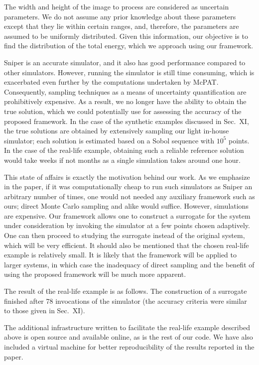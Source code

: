 \begin{authors}
The width and height of the image to process are considered as uncertain
parameters. We do not assume any prior knowledge about these parameters except
that they lie within certain ranges, and, therefore, the parameters are assumed
to be uniformly distributed. Given this information, our objective is to find
the distribution of the total energy, which we approach using our framework.

Sniper is an accurate simulator, and it also has good performance compared to
other simulators. However, running the simulator is still time consuming, which
is exacerbated even further by the computations undertaken by McPAT.
Consequently, sampling techniques as a means of uncertainty quantification are
prohibitively expensive. As a result, we no longer have the ability to obtain
the true solution, which we could potentially use for assessing the accuracy of
the proposed framework. In the case of the synthetic examples discussed in
Sec.~XI, the true solutions are obtained by extensively sampling our light
in-house simulator; each solution is estimated based on a Sobol sequence with
$10^5$ points. In the case of the real-life example, obtaining such a reliable
reference solution would take weeks if not months as a single simulation takes
around one hour.

This state of affairs is exactly the motivation behind our work. As we emphasize
in the paper, if it was computationally cheap to run such simulators as Sniper
an arbitrary number of times, one would not needed any auxiliary framework such
as ours; direct Monte Carlo sampling and alike would suffice. However,
simulations are expensive. Our framework allows one to construct a surrogate for
the system under consideration by invoking the simulator at a few points chosen
adaptively. One can then proceed to studying the surrogate instead of the
original system, which will be very efficient. It should also be mentioned that
the chosen real-life example is relatively small. It is likely that the
framework will be applied to larger systems, in which case the inadequacy of
direct sampling and the benefit of using the proposed framework will be much
more apparent.

The result of the real-life example is as follows. The construction of a
surrogate finished after 78 invocations of the simulator (the accuracy criteria
were similar to those given in Sec.~XI).

The additional infrastructure written to facilitate the real-life example
described above is open source and available online, as is the rest of our code.
We have also included a virtual machine for better reproducibility of the
results reported in the paper.

\begin{actions}
\end{actions}
\end{authors}
